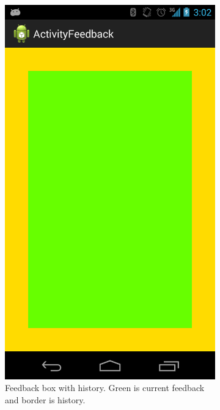 \documentclass[a4paper,10pt,english,lof,lot,twoside]{puthesis}
\begin{document}
\begin{figure}
\begin{subfigure}[t]{0.30\linewidth}
\includegraphics[width=0.800\linewidth]{early-prototype-feedback-box-w-history.png}
\caption[Feedback box with history]{Feedback box with history. Green is current feedback and border is history.}\label{ch-design/index:fig-early-prototype-feedback-box-w-history}\end{subfigure}
\begin{subfigure}[t]{0.30\linewidth}
\centering
\capstart


\end{subfigure}
\end{figure}
\end{document}
